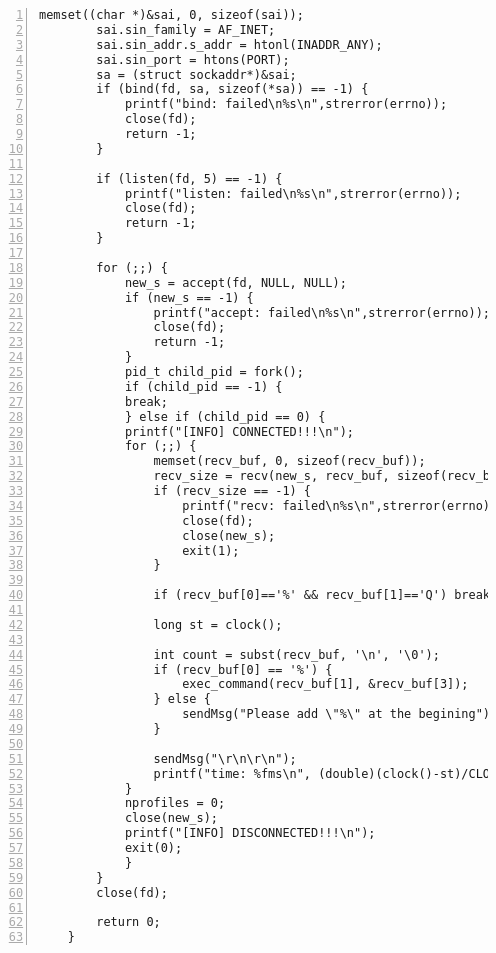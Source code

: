 \documentclass[11pt]{jarticle}
\begin{document}
\begin{lstlisting}[caption=サーバ側プログラム,label=server,numbers=left]
        memset((char *)&sai, 0, sizeof(sai));
        sai.sin_family = AF_INET;
        sai.sin_addr.s_addr = htonl(INADDR_ANY);
        sai.sin_port = htons(PORT);
        sa = (struct sockaddr*)&sai;
        if (bind(fd, sa, sizeof(*sa)) == -1) {
            printf("bind: failed\n%s\n",strerror(errno));
            close(fd);
            return -1;
        }

        if (listen(fd, 5) == -1) {
            printf("listen: failed\n%s\n",strerror(errno));
            close(fd);
            return -1;
        }

        for (;;) {
            new_s = accept(fd, NULL, NULL);
            if (new_s == -1) {
                printf("accept: failed\n%s\n",strerror(errno));
                close(fd);
                return -1;
            }
            pid_t child_pid = fork();
            if (child_pid == -1) {
            break;
            } else if (child_pid == 0) {
            printf("[INFO] CONNECTED!!!\n");
            for (;;) {
                memset(recv_buf, 0, sizeof(recv_buf));
                recv_size = recv(new_s, recv_buf, sizeof(recv_buf), 0);
                if (recv_size == -1) {
                    printf("recv: failed\n%s\n",strerror(errno));
                    close(fd);
                    close(new_s);
                    exit(1);
                }

                if (recv_buf[0]=='%' && recv_buf[1]=='Q') break;
                
                long st = clock();

                int count = subst(recv_buf, '\n', '\0');
                if (recv_buf[0] == '%') {
                    exec_command(recv_buf[1], &recv_buf[3]);
                } else {
                    sendMsg("Please add \"%\" at the begining");
                }
                
                sendMsg("\r\n\r\n");
                printf("time: %fms\n", (double)(clock()-st)/CLOCK_PER_SEC);
            }
            nprofiles = 0;
            close(new_s);
            printf("[INFO] DISCONNECTED!!!\n");
            exit(0);
            }  
        }
        close(fd);

        return 0;
    }

\end{lstlisting}
\end{document}
